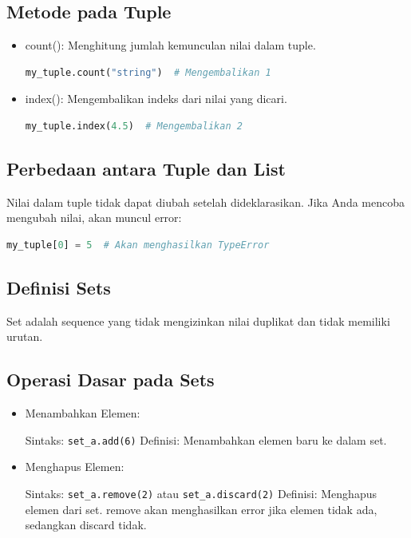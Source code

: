 \documentclass{article}
\begin{document}
\subsection{Metode pada Tuple}
\begin{itemize}
    \item count(): Menghitung jumlah kemunculan nilai dalam tuple.
          \begin{lstlisting}[language=Python, caption={}, captionpos=b]
my_tuple.count("string")  # Mengembalikan 1
\end{lstlisting}
    \item index(): Mengembalikan indeks dari nilai yang dicari.
          \begin{lstlisting}[language=Python, caption={}, captionpos=b]
my_tuple.index(4.5)  # Mengembalikan 2
\end{lstlisting}
\end{itemize}

\subsection{Perbedaan antara Tuple dan List}
Nilai dalam tuple tidak dapat diubah setelah dideklarasikan. Jika Anda mencoba mengubah nilai, akan muncul error:
\begin{lstlisting}[language=Python, caption={}, captionpos=b]
my_tuple[0] = 5  # Akan menghasilkan TypeError
\end{lstlisting}

\subsection{Definisi Sets}
Set adalah sequence yang tidak mengizinkan nilai duplikat dan tidak memiliki urutan.

\subsection{Operasi Dasar pada Sets}
\begin{itemize}
    \item Menambahkan Elemen:

          Sintaks: \verb|set_a.add(6)|
          Definisi: Menambahkan elemen baru ke dalam set.
    \item Menghapus Elemen:

          Sintaks: \verb|set_a.remove(2)| atau \verb|set_a.discard(2)|
          Definisi: Menghapus elemen dari set. remove akan menghasilkan error jika elemen tidak ada, sedangkan discard tidak.
\end{itemize}
\end{document}
